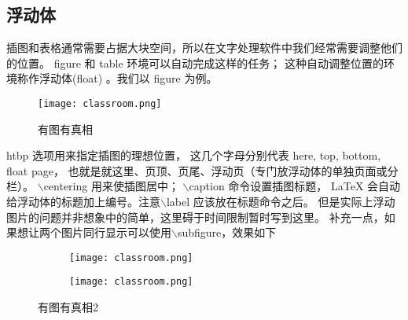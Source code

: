 \subsection{浮动体}
插图和表格通常需要占据大块空间，所以在文字处理软件中我们经常需要调整他们的位置。
figure 和 table 环境可以自动完成这样的任务；
这种自动调整位置的环境称作浮动体(float) 。我们以 figure 为例。
\begin{figure}[htbp]
    \centering
    \texttt{[image: classroom.png]}
    \caption{有图有真相}
    \label{fig:myphoto}
\end{figure}
htbp 选项用来指定插图的理想位置，
这几个字母分别代表 here, top, bottom, float page，
也就是就这里、页顶、页尾、浮动页（专门放浮动体的单独页面或分栏）。
$\backslash$centering 用来使插图居中；
$\backslash$caption 命令设置插图标题，
LaTeX 会自动给浮动体的标题加上编号。注意$\backslash$label 应该放在标题命令之后。
但是实际上浮动图片的问题并非想象中的简单，这里碍于时间限制暂时写到这里。
补充一点，如果想让两个图片同行显示可以使用$\backslash$subfigure，效果如下
\begin{figure}[htbp]
    \centering
    \begin{subfigure}[b]{0.45\textwidth}
        \texttt{[image: classroom.png]}
        \label{fig:image1}
    \end{subfigure}
    \hfill
    \begin{subfigure}[b]{0.45\textwidth}
        \texttt{[image: classroom.png]}
        \label{fig:image2}
    \end{subfigure}
    \caption{有图有真相2}
    \label{fig:twosubfigs004}
\end{figure}
